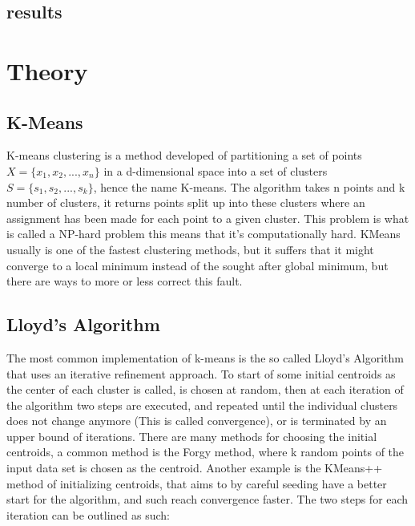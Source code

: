 \documentclass[12pt]{report}
\begin{document}
\section{results}
\label{sec:intro_results}








\chapter{Theory}
\label{sec:label}

\section{K-Means}
\label{subsec:kmeans}

K-means clustering is a method developed  of partitioning a set of points $X = \{x_1, x_2, ..., x_n\}$ in a d-dimensional space into a set of clusters $S = \{s_1, s_2, ..., s_k\}$, hence the name K-means. The algorithm takes n points and k number of clusters, it returns points split up into these clusters where an assignment has been made for each point to a given cluster. This problem is what is called a NP-hard problem this means that it's computationally hard. KMeans usually is one of the fastest clustering methods, but it suffers that it might converge to a local minimum instead of the sought after global minimum, but there are ways to more or less correct this fault.\cite{lloyd}

\section{Lloyd's Algorithm}
\label{subsec:lloyds}

The most common implementation of k-means is the so called Lloyd's Algorithm that uses an iterative refinement approach. To start of some initial centroids as the center of each cluster is called, is chosen at random, then at each iteration of the algorithm two steps are executed, and repeated until the individual clusters does not change anymore (This is called convergence), or is terminated by an upper bound of iterations. There are many methods for choosing the initial centroids, a common method is the Forgy method, where k random points of the input data set is chosen as the centroid. Another example is the KMeans++ method of initializing centroids, that aims to by careful seeding have a better start for the algorithm, and such reach convergence faster.\cite{plusplus} The two steps for each iteration can be outlined as such: \\
\end{document}
